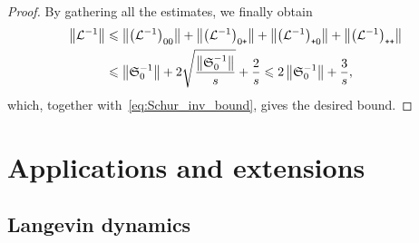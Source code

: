 \documentclass[10pt]{amsart}
\theoremstyle{definition}\newtheorem{defi}[theo]{Definition}\newtheorem{rema}[theo]{Remark}\newtheorem{exam}[theo]{Example}\newtheorem{exem}[theo]{Example}\newtheorem{nota}[theo]{Notation}
\newcommand{\cL}{\mathcal{L}}
\newcommand{\Schur}{\mathfrak{S}_0}
\newcommand{\subplus}{\textnormal{\texttt{+}}}
\renewcommand{\le}{\leqslant}
\begin{document}
\begin{proof}
By gathering all the estimates, we finally obtain
\begin{align*}
\left\|\cL^{-1}\right\| &\le \left\|\left(\cL^{-1}\right)_{00}\right\| + \left\|\left(\cL^{-1}\right)_{0\subplus}\right\| + \left\|\left(\cL^{-1}\right)_{\subplus0}\right\| + \left\|\left(\cL^{-1}\right)_{\subplus\subplus}\right\|\\
&\le \left\|\Schur^{-1}\right\| + 2 \sqrt{\frac {\left\|\Schur^{-1}\right\|} { s}} + \frac 2 s \le 2\left\|\Schur^{-1}\right\| + \frac 3 s,
\end{align*}
which, together with~\eqref{eq:Schur_inv_bound}, gives the desired bound.
\end{proof}

\section{Applications and extensions}\label{sec:applications}

\subsection{Langevin dynamics}\label{sec:application_Langevin}
\end{document}
